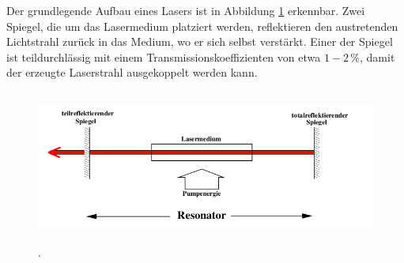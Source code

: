 Der grundlegende Aufbau eines Lasers ist in Abbildung \ref{fig:laseraufbau} erkennbar.
Zwei Spiegel, die um das Lasermedium platziert werden, reflektieren den austretenden
Lichtstrahl zurück in das Medium, wo er sich selbst verstärkt. Einer der Spiegel ist
teildurchlässig mit einem Transmissionskoeffizienten von etwa $1-2 \, \si{\percent}$,
damit der erzeugte Laserstrahl ausgekoppelt werden kann. 

\begin{figure}
  \centering
  \includegraphics[height=5cm]{Pics von Buddy/laseraufbau.png}
  \caption{\cite{anleitung}.}
  \label{fig:laseraufbau}
\end{figure}
